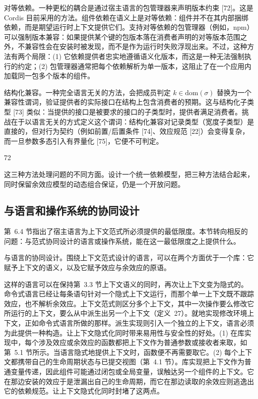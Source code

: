 \documentclass[
  10
]{article}
\begin{document}
对等依赖。一种更松的耦合是通过宿主语言的包管理器来声明版本约束 {[}72{]}。这是 Cordis 目前采用的方法。组件依赖在语义上是对等依赖：组件并不在其内部捆绑依赖，而是期望运行时上下文提供它们。支持对等依赖的包管理器（例如，npm）可以强制版本兼容：如果提供某个键的包版本落在消费者声明的对等版本范围之外，不兼容性会在安装时被发现，而不是作为运行时失败浮现出来。不过，这种方法有两个局限：(1) 它依赖提供者忠实地遵循语义化版本，而这是一种无法强制执行的约定；(2) 包管理器通常把每个依赖解析为单一版本，这阻止了在一个应用内加载同一包多个版本的组件。

结构化兼容。一种完全语言无关的方法，会把成员判定 \(k \in \mathrm { d o m } ( \sigma )\) 替换为一个兼容性谓词，验证提供者的实际接口在结构上包含消费者的预期。这与结构化子类型 {[}73{]} 类似：当提供的接口是被要求的接口的子类型时，提供者满足消费者。挑战在于以语言无关的方式定义这个谓词：结构化兼容对记录类型（宽度子类型）是直接的，但对行为契约（例如前置/后置条件 {[}74{]}、效应规范 {[}22{]}）会变得复杂，而一旦参数多态引入有界量化 {[}75{]}，它便不可判定。

72

这三种方法处理问题的不同方面。设计一个统一依赖模型，把三种方法结合起来，同时保留余效应模型的动态组合保证，仍是一个开放问题。

\subsection{与语言和操作系统的协同设计} \label{co-design-with-languages-and-operating-systems}

第~6.4 节指出了宿主语言为上下文范式所必须提供的最低限度。本节转向相反的问题：与范式协同设计的语言或操作系统，能在这一最低限度之上提供什么。

与语言的协同设计。围绕上下文范式设计的语言，可以在两个方面优于一个库：它赋予上下文的语义，以及它赋予效应与余效应的原语。

这样的语言可以在保持第~3.3 节上下文语义的同时，再次让上下文变为隐式的。命令式语言已经让每条语句针对一个隐式上下文运行，而那个单一上下文既不跟踪效应，也不解析余效应。上下文范式则区分多个上下文，其中一次操作要么修改它所运行的上下文，要么从中派生出另一个上下文（定义~27）。就地实现修改环境上下文，正如命令式语言所做的那样。派生实现则引入一个独立的上下文，语言必须为此提供一种构造。让上下文隐式化同时带来易用性与安全性的好处。(1) 在库实现中，每个涉及效应或余效应的函数都把上下文作为普通参数或接收者来取，如第~5.1 节所示。当语言隐式地提供上下文时，函数便不再需要取它。(2) 每个上下文都携带自己的生命周期状态与已提交视图（第~4.1 节）。库实现把上下文作为普通变量传递，因此组件可能通过闭包或全局变量，误触达另一个组件的上下文。它在那边安装的效应于是泄漏出自己的生命周期，而它在那边读取的余效应则逃逸出它的依赖规范。让上下文隐式化同时封堵了这两点。
\end{document}
